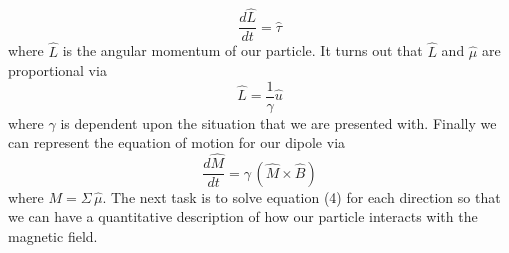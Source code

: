 \documentclass[twocolumn]{article}
\begin{document}
\begin{equation}
\frac{d\hat{L}}{dt}=\hat{\tau}
\end{equation}
where $\hat{L}$ is the angular momentum of our particle. It turns out that $\hat{L}$ and $\hat{\mu}$ are proportional via
\begin{equation}
\hat{L}=\frac{1}{\gamma}\hat{u}
\end{equation}
where $\gamma$ is dependent upon the situation that we are presented with. Finally we can represent the equation of motion for our dipole via
\begin{equation}
\frac{d\hat{M}}{dt}=\gamma \hspace{2pt} (\hat{M} \times \hat{B})
\end{equation}
where $M=\Sigma \hspace{2pt} \hat{\mu}$. The next task is to solve equation (4) for each direction so that we can have a quantitative description of how our particle interacts with the magnetic field.
\end{document}
